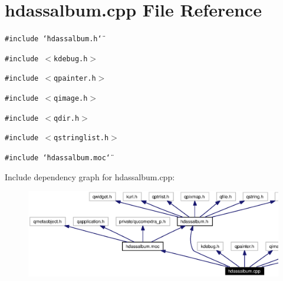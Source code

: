 \section{hdassalbum.cpp File Reference}
\label{hdassalbum_8cpp}


{\tt \#include \char`\"{}hdassalbum.h\char`\"{}}\par
{\tt \#include $<$kdebug.h$>$}\par
{\tt \#include $<$qpainter.h$>$}\par
{\tt \#include $<$qimage.h$>$}\par
{\tt \#include $<$qdir.h$>$}\par
{\tt \#include $<$qstringlist.h$>$}\par
{\tt \#include \char`\"{}hdassalbum.moc\char`\"{}}\par


Include dependency graph for hdassalbum.cpp:\begin{figure}[H]
\begin{center}
\leavevmode
\includegraphics[width=384pt]{hdassalbum_8cpp__incl}
\end{center}
\end{figure}
